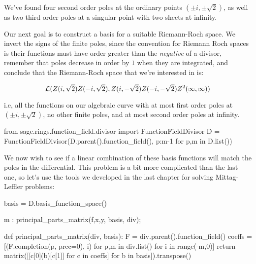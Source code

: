 We've found four second order poles at the ordinary points $(\pm i, \pm\sqrt{2})$,
as well as two third order poles at a singular point with two sheets at infinity.

Our next goal is to construct a basis for a suitable Riemann-Roch space.
We invert the signs of the finite poles,
since the convention for Riemann Roch spaces is their functions must
have order greater than the {\it negative} of a divisor, remember
that poles decrease in order by $1$ when they are integrated,
and conclude that the Riemann-Roch space that we're interested in is:

$${\cal L}(Z(i, \sqrt{2}) Z(-i, \sqrt{2}), Z(i, -\sqrt{2}) Z(-i, -\sqrt{2}) Z^2(\infty,\infty))$$

i.e, all the functions on our algebraic curve with at most first order
poles at $(\pm i,\pm\sqrt{2})$, no other finite poles, and at most
second order poles at infinity.


\begin{sageblock}[riemannroch3]
from sage.rings.function_field.divisor import FunctionFieldDivisor
D = FunctionFieldDivisor(D.parent().function_field(), {p:m-1 for p,m in D.list()})
\end{sageblock}

We now wish to see if a linear combination of these basis functions will
match the poles in the differential.  This problem is a bit more complicated
than the last one, so let's use the tools we developed in the
last chapter for solving Mittag-Leffler problems:

\begin{sageblock}[riemannroch3]
basis = D.basis_function_space()
\end{sageblock}

\begin{maximablock}
m : principal_parts_matrix(f,x,y, basis, div);
\end{maximablock}

\begin{sageblock}[riemannroch3]
def principal_parts_matrix(div, basis):
    F = div.parent().function_field()
    coeffs = [(F.completion(p, prec=0), i) for p,m in div.list() for i in range(-m,0)]
    return matrix([[c[0](b)[c[1]] for c in coeffs] for b in basis]).transpose()
\end{sageblock}

